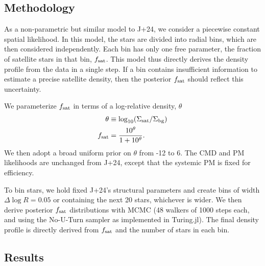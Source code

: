 \subsection{Methodology}\label{methodology}

As a non-parametric but similar model to J+24, we consider a piecewise
constant spatial likelihood. In this model, the stars are divided into
radial bins, which are then considered independently. Each bin has only
one free parameter, the fraction of satellite stars in that bin,
\(f_{\rm sat}\). This model thus directly derives the density profile
from the data in a single step. If a bin contains insufficient
information to estimate a precise satellite density, then the posterior
\(f_{\rm sat}\) should reflect this uncertainty.

We parameterize \(f_{\rm sat}\) in terms of a log-relative density,
\(\theta\) \begin{equation}{
\begin{split}
\theta &\equiv \log_{10}({\Sigma_{\rm sat}}/{\Sigma_{\rm bg}}) \\
f_{\rm sat} &= \frac{10^{\theta}}{1 + 10^{\theta}}.
\end{split}
}\end{equation} We then adopt a broad uniform prior on \(\theta\) from
-12 to 6. The CMD and PM likelihoods are unchanged from J+24, except
that the systemic PM is fixed for efficiency.

To bin stars, we hold fixed J+24's structural parameters and create bins
of width \(\Delta \log R=0.05\) or containing the next 20 stars,
whichever is wider. We then derive posterior \(f_{\rm sat}\)
distributions with MCMC (48 walkers of 1000 steps each, and using the
No-U-Turn sampler as implemented in Turing.jl). The final density
profile is directly derived from \(f_{\rm sat}\) and the number of stars
in each bin.

\subsection{Results}\label{results}

